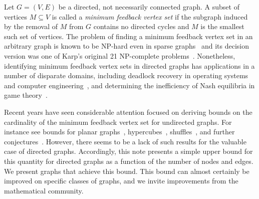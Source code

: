 \documentclass[journal,12pt,onecolumn]{IEEETran}  %
\begin{document}

%
\IEEEpeerreviewmaketitle




Let $G=(V,E)$ be a directed, not necessarily connected graph.
A subset of vertices $M\subseteq V$ is called a \emph{minimum feedback vertex set} if the subgraph induced by the removal of $M$ from $G$ contains no directed cycles and $M$ is the smallest such set of vertices.
The problem of finding a minimum feedback vertex set in an arbitrary graph is known to be NP-hard even in sparse graphs~\cite{Fomin2006,Borradaile2019} and its decision version was one of Karp's original 21 NP-complete problems~\cite{Karp1972}.
Nonetheless, identifying minimum feedback vertex sets in directed graphs has applications in a number of disparate domains, including deadlock recovery in operating systems and computer engineering~\cite{Lin2000}, and determining the inefficiency of Nash equilibria in game theory~\cite{Brown2019c}.


Recent years have seen considerable attention focused on deriving bounds on the cardinality of the minimum feedback vertex set for undirected graphs. For instance see bounds for planar graphs~\cite{Kelly2017}, hypercubes~\cite{Madelaine2008}, shuffles~\cite{Kralovic2003}, and further conjectures~\cite{Kowalik2010}.
However, there seems to be a lack of such results for the valuable case of directed graphs.
Accordingly, this note presents a simple upper bound for this quantity for directed graphs as a function of the number of nodes and edges.
We present graphs that achieve this bound.
This bound can almost certainly be improved on specific classes of graphs, and we invite improvements from the mathematical community.
\end{document}
